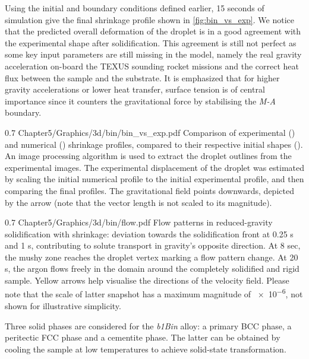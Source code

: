 Using the initial and boundary conditions defined earlier, 15 seconds of simulation give the final shrinkage profile shown in \cref{fig:bin_vs_exp}.
We notice that the predicted overall deformation of the droplet is in a good agreement with the experimental shape after solidification.
This agreement is still not perfect as some key input parameters are still missing in the model, 
namely the real gravity acceleration on-board the TEXUS sounding rocket missions 
and the correct heat flux between the sample and the substrate. 
It is emphasized that for higher gravity accelerations or lower heat transfer, surface tension is of central importance since 
it counters the gravitational force by stabilising the \emph{M-A} boundary.

\begin{figureth}
{0.7}
{Chapter5/Graphics/3d/bin/bin_vs_exp.pdf}
{Comparison of experimental () and numerical () shrinkage profiles, compared to their respective initial shapes (). 
An image processing algorithm is used to extract the droplet outlines from the experimental images. 
The experimental displacement of the droplet was estimated by scaling 
the initial numerical profile to the initial experimental profile, and then comparing the final profiles.
The gravitational field points downwards, depicted
by the arrow (note that the vector length is not scaled to its magnitude).}
\label{fig:bin_vs_exp}
\end{figureth}
\begin{figureth}
{0.7}
{Chapter5/Graphics/3d/bin/flow.pdf}
{Flow patterns in reduced-gravity solidification with shrinkage: 
deviation towards the solidification front at 0.25 s and 1 s, contributing to solute transport in gravity's opposite direction.
At 8 sec, the mushy zone reaches the droplet vertex marking a flow pattern change. 
At 20 s, the argon flows freely in the domain around the completely solidified and rigid sample.
Yellow arrows help visualise the directions of the velocity field. 
Please note that the scale of latter snapshot has a maximum magnitude of \SI{e-6}{\uvelocity}, not shown
for illustrative simplicity.}
\label{fig:texus_flow}
\end{figureth}
Three solid phases are considered for the \emph{b1Bin} alloy: a primary BCC phase, a peritectic FCC phase and a cementite phase. 
The latter can be obtained by cooling the sample at low temperatures to achieve solid-state transformation.
